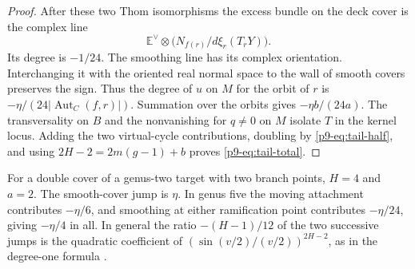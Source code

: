 \begin{proof}
After these two Thom isomorphisms the excess bundle on the deck cover
is the complex line
\[
 \mathbb E^\vee\otimes
 \bigl(N_{f(r)}/d\xi_r(T_rY)\bigr).
\]
Its degree is $-1/24$. The smoothing line has its complex orientation.
Interchanging it with the oriented real normal space
to the wall of smooth covers preserves the sign.
Thus the degree of $u$ on $M$ for the orbit of $r$ is
$-\eta/(24|\operatorname{Aut}_C(f,r)|)$. Summation over the orbits
gives $-\eta b/(24a)$. The transversality on $B$ and the nonvanishing
for $q\ne0$ on $M$ isolate $T$ in the kernel locus. Adding the two
virtual-cycle contributions, doubling by \eqref{p9-eq:tail-half}, and
using $2H-2=2m(g-1)+b$ proves \eqref{p9-eq:tail-total}.
\end{proof}

For a double cover of a genus-two target with two branch points,
$H=4$ and $a=2$. The smooth-cover jump is $\eta$. In genus five
the moving attachment contributes $-\eta/6$, and smoothing at either
ramification point contributes $-\eta/24$, giving $-\eta/4$ in all.
In general the ratio $-(H-1)/12$ of the two successive jumps is the
quadratic coefficient of $(\sin(v/2)/(v/2))^{2H-2}$, as in the
degree-one formula \cite[Theorem~2]{pandhodge}.
